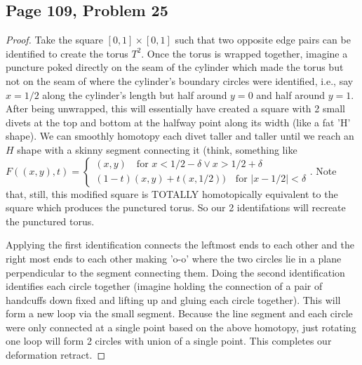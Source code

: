 \subsection*{Page 109, Problem 25}
\vspace{15pt}
\begin{proof}
    \vspace{-10pt}
    Take the square $[0,1]\times[0,1]$ such that two opposite  edge pairs can be identified to create the torus $T^2$. Once the torus is wrapped together, imagine a puncture poked directly on the seam of the cylinder which made the torus but not on the seam of where the cylinder's boundary circles were identified, i.e., say $x =  1/2$ along the cylinder's length but half around $y=0$ and half around $y=1$. After being unwrapped, this will essentially have created a square with 2 small divets at the top and bottom at the halfway point along its width (like a fat 'H' shape). We can smoothly homotopy each divet taller and taller until we reach an $H$ shape with a skinny segment connecting it (think, something like $F((x,y),t) = \begin{cases}(x,y) \quad \text{for }x < 1/2 - \delta \vee x > 1/2 + \delta\\ (1-t)(x,y) + t(x,1/2)) \quad \text{for } |x - 1/2| < \delta \end{cases}$. Note that, still, this modified square is TOTALLY homotopically equivalent to the square which produces the punctured torus. So our 2 identifations will recreate the punctured torus.
    
    Applying the first identification connects the leftmost ends to each other and the right most ends to each other making 'o-o' where the two circles lie in a plane perpendicular to the segment connecting them. Doing the second identification identifies each circle together (imagine holding the connection of a pair of handcuffs down fixed and lifting up and gluing each circle together). This will form a new loop via the small segment. Because the line segment and each circle were only connected at a single point based on the above homotopy, just rotating one loop will form 2 circles with union of a single point. This completes our deformation retract.
\end{proof}


